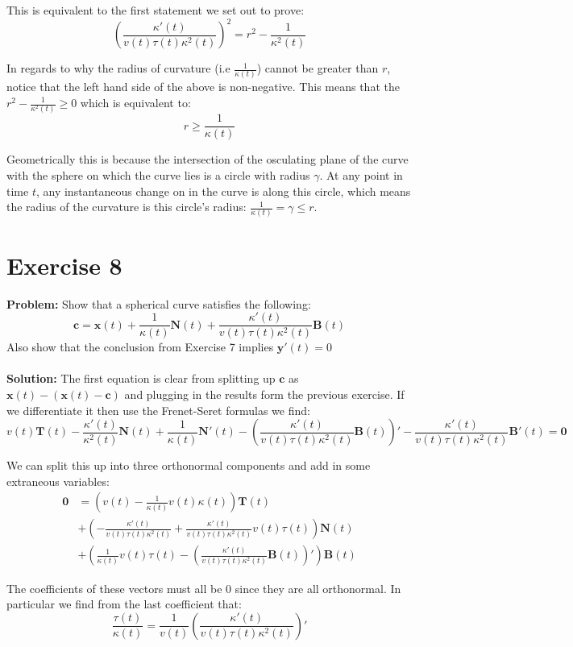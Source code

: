 \documentclass{article}
\begin{document}
This is equivalent to the first statement we set out to prove:
$$\left(\frac{\kappa'(t)}{v(t)\tau(t)\kappa^2(t)}\right)^2=r^2-\frac{1}{\kappa^2(t)}$$

In regards to why the radius of curvature (i.e $\frac{1}{\kappa(t)}$) cannot be greater than $r$, notice that the left hand side of the above is non-negative. This means that the $r^2-\frac{1}{\kappa^2(t)}\ge 0$ which is equivalent to:
$$r\ge\frac{1}{\kappa(t)}$$

Geometrically this is because the intersection of the osculating plane of the curve with the sphere on which the curve lies is a circle with radius $\gamma$. At any point in time $t$, any instantaneous change on in the curve is along this circle, which means the radius of the curvature is this circle's radius: $\frac{1}{\kappa(t)}=\gamma\le r$.
\section*{Exercise 8}
\textbf{Problem:} Show that a spherical curve satisfies the following:
$$\mathbf c=\mathbf x(t)+\frac{1}{\kappa(t)}\mathbf N(t)+\frac{\kappa'(t)}{v(t)\tau(t)\kappa^2(t)}\mathbf B(t)$$
Also show that the conclusion from Exercise 7 implies $\mathbf y'(t)=0$
\\\\
\textbf{Solution:} The first equation is clear from splitting up $\mathbf c$ as $\mathbf x(t)-(\mathbf x(t)-\mathbf c)$ and plugging in the results form the previous exercise. If we differentiate it then use the Frenet-Seret formulas we find:
$$v(t)\mathbf T(t)-\frac{\kappa'(t)}{\kappa^2(t)}\mathbf N(t)+\frac{1}{\kappa(t)}\mathbf N'(t)-\left(\frac{\kappa'(t)}{v(t)\tau(t)\kappa^2(t)}\mathbf B(t)\right)'-\frac{\kappa'(t)}{v(t)\tau(t)\kappa^2(t)}\mathbf B'(t)=\mathbf 0$$

We can split this up into three orthonormal components and add in some extraneous variables:
\begin{align*}
  \mathbf 0&=\left(v(t)-\frac{1}{\kappa(t)}v(t)\kappa(t)\right)\mathbf T(t)\\
  &+\left(-\frac{\kappa'(t)}{v(t)\tau(t)\kappa^2(t)}+\frac{\kappa'(t)}{v(t)\tau(t)\kappa^2(t)}v(t)\tau(t)\right)\mathbf N(t)\\
  &+\left(\frac{1}{\kappa(t)}v(t)\tau(t)-\left(\frac{\kappa'(t)}{v(t)\tau(t)\kappa^2(t)}\mathbf B(t)\right)'\right)\mathbf B(t)
\end{align*}

The coefficients of these vectors must all be 0 since they are all orthonormal. In particular we find from the last coefficient that:
$$\frac{\tau(t)}{\kappa(t)}=\frac{1}{v(t)}\left(\frac{\kappa'(t)}{v(t)\tau(t)\kappa^2(t)}\right)'$$
\end{document}
